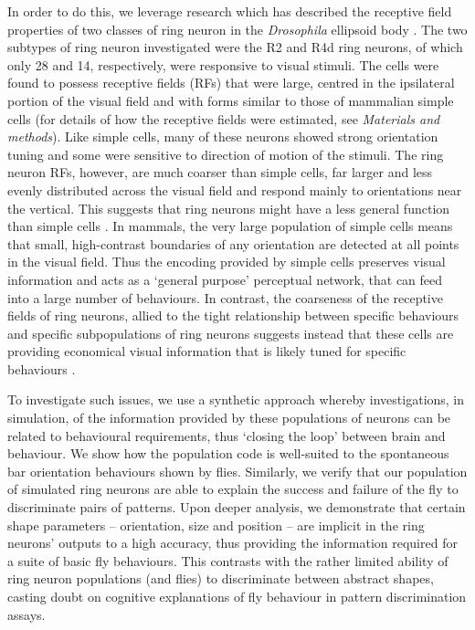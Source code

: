 \documentclass[10pt]{article}
\begin{document}
In order to do this, we leverage research which has described the receptive field properties of two classes of ring neuron in the \emph{Drosophila} ellipsoid body \cite{Seelig2013}. The two subtypes of ring neuron investigated were the R2 and R4d ring neurons, of which only 28 and 14, respectively, were responsive to visual stimuli. The cells were found to possess receptive fields (RFs) that were large, centred in the ipsilateral portion of the visual field and with forms similar to those of mammalian simple cells \cite{Hubel1962} (for details of how the receptive fields were estimated, see \emph{Materials and methods}). Like simple cells, many of these neurons showed strong orientation tuning and some were sensitive to direction of motion of the stimuli. The ring neuron RFs, however, are much coarser than simple cells, far larger and less evenly distributed across the visual field and respond mainly to orientations near the vertical. This suggests that ring neurons might have a less general function than simple cells \cite{Wystrach2014}. In mammals, the very large population of simple cells means that small, high-contrast boundaries of any orientation are detected at all points in the visual field. Thus the encoding provided by simple cells preserves visual information and acts as a `general purpose' perceptual network, that can feed into a large number of behaviours. In contrast, the coarseness of the receptive fields of ring neurons, allied to the tight relationship between specific behaviours and specific subpopulations of ring neurons suggests instead that these cells are providing economical visual information that is likely tuned for specific behaviours \cite{Wystrach2014}.

To investigate such issues, we use a synthetic approach whereby investigations, in simulation, of the information provided by these populations of neurons can be related to behavioural requirements, thus `closing the loop' between brain and behaviour. We show how the population code is well-suited to the spontaneous bar orientation behaviours shown by flies. Similarly, we verify that our population of simulated ring neurons are able to explain the success and failure of the fly to discriminate pairs of patterns. Upon deeper analysis, we demonstrate that certain shape parameters -- orientation, size and position -- are implicit in the ring neurons' outputs to a high accuracy, thus providing the information required for a suite of basic fly behaviours. This contrasts with the rather limited ability of ring neuron populations (and flies) to discriminate between abstract shapes, casting doubt on cognitive explanations of fly behaviour in pattern discrimination assays.
\end{document}
